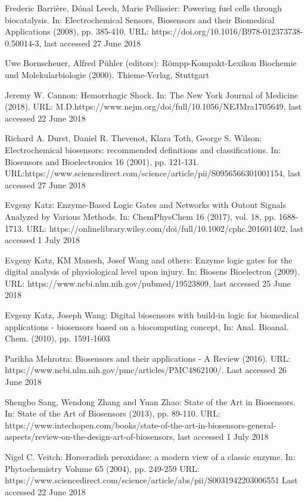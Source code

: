 \documentclass[runningheads]{llncs}
\begin{document}
\newpage

\begin{thebibliography}{8}
	Frederic Barrière, Dónal Leech, Marie Pellissier: Powering fuel cells through biocatalysis. In: Electrochemical Sensors, Biosensors and their Biomedical Applications (2008), pp. 385-410. URL: https://doi.org/10.1016/B978-012373738-0.50014-3, last accessed 27 June 2018
	
	Uwe Bornscheuer, Alfred P{\"u}hler (editors): R{\"o}mpp-Kompakt-Lexikon Biochemie und Molekularbiologie (2000). Thieme-Verlag, Stuttgart
	
	Jeremy W. Cannon: Hemorrhagic Shock. In: The New York Journal of Medicine (2018). URL: M.D.https://www.nejm.org/doi/full/10.1056/NEJMra1705649, last accessed 22 June 2018
	
	Richard A. Durst, Daniel R. Thevenot, Klara Toth, George S. Wilson: Electrochemical biosensors: recommended definitions and classifications. In: Biosensors and Bioelectronics 16 (2001), pp. 121-131. URL:https://www.sciencedirect.com/science/article/pii/S0956566301001154, last accessed 27 June 2018
	
	Evgeny Katz: Enzyme-Based Logic Gates and Networks with Outout Signals Analyzed by Various Methods. In: ChemPhysChem 16 (2017), vol. 18, pp. 1688-1713. URL: https://onlinelibrary.wiley.com/doi/full/10.1002/cphc.201601402, last accessed 1 July 2018
	
	Evgeny Katz, KM Manesh, Josef Wang and others: Enzyme logic gates for the digital analysis of physiological level upon injury. In: Biosens Bioelectron (2009). URL: https://www.ncbi.nlm.nih.gov/pubmed/19523809, last accessed 25 June 2018
	
	Evgeny Katz, Joseph Wang: Digital biosensors with build-in logic for biomedical applications - biosensors based on a biocomputing concept, In: Anal. Bioanal. Chem. (2010), pp. 1591-1603 
	
	Parikha Mehrotra: Biosensors and their applications - A Review (2016). URL: https://www.ncbi.nlm.nih.gov/pmc/articles/PMC4862100/. Last accessed 26 June 2018
	
	Shengbo Sang, Wendong Zhang and Yuan Zhao: State of the Art in Biosensors. In: State of the Art of Biosensors (2013), pp. 89-110. URL: https://www.intechopen.com/books/state-of-the-art-in-biosensors-general-aspects/review-on-the-design-art-of-biosensors, last accessed 1 July 2018
	
	Nigel C. Veitch: Horseradish peroxidase: a modern view of a classic enzyme. In: Phytochemistry
	Volume 65 (2004), pp. 249-259 
	URL: https://www.sciencedirect.com/science/article/abs/pii/S0031942203006551  Last accessed 22 June 2018
	

	
\end{thebibliography}
\end{document}
